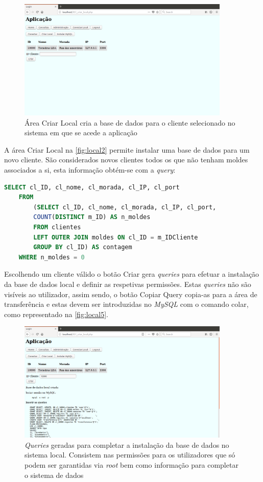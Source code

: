\documentclass[11pt,twoside,a4paper]{report}
\begin{document}
	\begin{figure}[H]
		\centering
		\includegraphics[width=0.9\textwidth]{local02} %
		\caption{Área Criar Local cria a base de dados para o cliente selecionado no sistema em que se acede a aplicação}
		\label{fig:local2}
	\end{figure}
A área Criar Local na \autoref{fig:local2} permite instalar uma base de dados para um novo cliente. São considerados novos clientes todos os que não tenham moldes associados a si, esta informação obtém-se com a \textit{query}:
\newpage
\begin{lstlisting}[language = SQL]
	SELECT cl_ID, cl_nome, cl_morada, cl_IP, cl_port
	FROM
		(SELECT cl_ID, cl_nome, cl_morada, cl_IP, cl_port,
		COUNT(DISTINCT m_ID) AS n_moldes
		FROM clientes
		LEFT OUTER JOIN moldes ON cl_ID = m_IDCliente
		GROUP BY cl_ID) AS contagem
	WHERE n_moldes = 0
\end{lstlisting}
Escolhendo um cliente válido o botão Criar gera \textit{queries} para efetuar a instalação da base de dados local e definir as respetivas permissões. Estas \textit{queries} não são visíveis ao utilizador, assim sendo, o botão Copiar Query copia-as para a área de transferência e estas devem ser introduzidas no \textit{MySQL} com o comando colar, como representado na \autoref{fig:local5}.
\begin{figure}[H]
	\begin{center}
		\includegraphics[width=0.9\textwidth]{local03} %
		\caption{\textit{Queries} geradas para completar a instalação da base de dados no sistema local. Consistem nas permissões para os utilizadores que só podem ser garantidas via \textit{root} bem como informação para completar o sistema de dados}
		\label{fig:local5}
	\end{center}
\end{figure}
\end{document}
